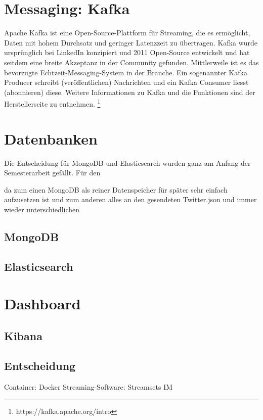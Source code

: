 \section{Messaging: Kafka}
\label{sec:messaging}

Apache Kafka ist eine Open-Source-Plattform für Streaming, die es ermöglicht, Daten mit hohem Durchsatz und geringer Latenzzeit zu übertragen. Kafka wurde ursprünglich bei LinkedIn konzipiert und 2011 Open-Source entwickelt und hat seitdem eine breite Akzeptanz in der Community gefunden. Mittlerweile ist es das bevorzugte Echtzeit-Messaging-System in der Branche. Ein sogenannter Kafka Producer schreibt (ver{\"o}ffentlichen) Nachrichten und ein Kafka Consumer liesst (abonnieren) diese. Weitere Informationen zu Kafka und die Funktionen sind der Herstellerseite zu entnehmen. \footnote{\label{foot:2} https://kafka.apache.org/intro}


\section{Datenbanken}
\label{sec:datenbanken}


Die Entscheidung für MongoDB und Elasticsearch wurden ganz am Anfang der Semesterarbeit gefällt. Für den 

da zum einen MongoDB als reiner Datenspeicher für später sehr einfach aufzusetzen ist und zum anderen alles an den gesendeten Twitter.json und immer wieder unterschiedlichen 

\subsection{MongoDB}

\subsection{Elasticsearch}


\section{Dashboard}
\label{sec:dashboard}
\subsection{Kibana}


\subsection{Entscheidung}

Container: Docker
Streaming-Software: Streamsets
IM 
